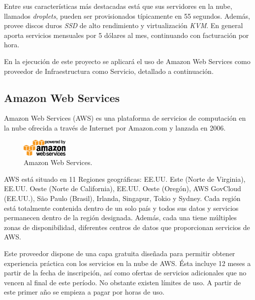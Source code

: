 
Entre sus características más destacadas está que sus servidores en la nube, llamados \textit{droplets}, pueden ser provisionados típicamente en 55 segundos. Además, provee discos duros \textit{SSD} de alto rendimiento y virtualización \textit{KVM}. En general aporta servicios mensuales por 5 dólares al mes, continuando con facturación por hora.

En la ejecución de este proyecto se aplicará el uso de Amazon Web Services como proveedor de Infraestructura como Servicio, detallado a continuación.

\subsection{Amazon Web Services}

Amazon Web Services (AWS) es una plataforma de servicios de computación en la nube ofrecida a través de Internet por Amazon.com y lanzada en 2006.

\begin{figure}[H]
\centering
\includegraphics[width=0.2\textwidth]{images/figures/aws.png}
\caption{Amazon Web Services.\footnotemark}
\end{figure}


AWS está situado en 11 Regiones geográficas: EE.UU. Este (Norte de Virginia), EE.UU. Oeste (Norte de California), EE.UU. Oeste (Oregón), AWS GovCloud (EE.UU.), São Paulo (Brasil), Irlanda, Singapur, Tokio y Sydney. Cada región está totalmente contenida dentro de un solo país y todos sus datos y servicios permanecen dentro de la región designada. Además, cada una tiene múltiples zonas de disponibilidad, diferentes centros de datos que proporcionan servicios de AWS.

Este proveedor dispone de una capa gratuita diseñada para permitir obtener experiencia práctica con los servicios en la nube de AWS. Ésta incluye 12 meses a partir de la fecha de inscripción, así como ofertas de servicios adicionales que no vencen al final de este período. No obstante existen límites de uso. A partir de este primer año se empieza a pagar por horas de uso.

